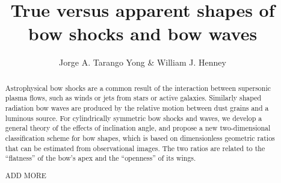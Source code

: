 \documentclass[useAMS, usenatbib, a4paper]{mnras}
\title[Bow shock shapes]{True versus apparent shapes of bow shocks and bow waves}
\author[Tarango Yong \& Henney]{
  Jorge A. Tarango Yong \& William J. Henney\\
  \AddressCRyA
}
\begin{document}
\maketitle
\begin{abstract}
  Astrophysical bow shocks are a common result of the interaction
  between supersonic plasma flows, such as winds or jets from stars or
  active galaxies.  Similarly shaped radiation bow waves are produced
  by the relative motion between dust grains and a luminous source.
  For cylindrically symmetric bow shocks and waves, we develop a
  general theory of the effects of inclination angle, and propose a
  new two-dimensional classification scheme for bow shapes, which is
  based on dimensionless geometric ratios that can be estimated from
  observational images.  The two ratios are related to the
  ``flatness'' of the bow's apex and the ``openness'' of its wings.

  ADD MORE
\end{abstract}






\clearpage

\clearpage


\clearpage


\appendix




\end{document}
